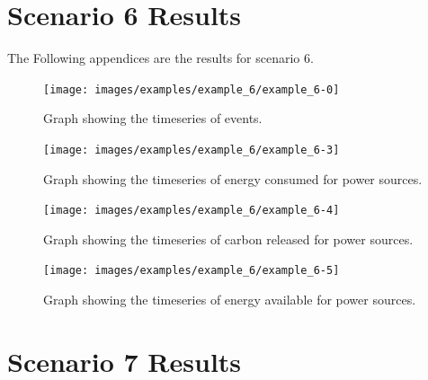 \documentclass{l4proj}
\begin{document}
\begin{appendices}
\section{Scenario 6 Results}\label{apen:subsec:scen6}
The Following appendices are the results for scenario 6.
\clearpage
\begin{figure}[htbp]
    \centering
    \texttt{[image: images/examples/example\_6/example\_6-0]}
    ~
    \caption{Graph showing the timeseries of events.}
    \label{fig:example6-0}
\end{figure}
\clearpage
\begin{figure}[htbp]
    \centering
    \texttt{[image: images/examples/example\_6/example\_6-3]}
    ~
    \caption{Graph showing the timeseries of energy consumed for power sources.}
    \label{fig:example6-1}
\end{figure}
\clearpage
\begin{figure}[htbp]
    \centering
    \texttt{[image: images/examples/example\_6/example\_6-4]}
    ~
    \caption{Graph showing the timeseries of carbon released for power sources.}
    \label{fig:example6-2}
\end{figure}
\clearpage
\begin{figure}[htbp]
    \centering
    \texttt{[image: images/examples/example\_6/example\_6-5]}
    ~
    \caption{Graph showing the timeseries of energy available for power sources.}
    \label{fig:example6-3}
\end{figure}

\clearpage
\section{Scenario 7 Results}\label{apen:subsec:scen7}

\end{appendices}
\end{document}
